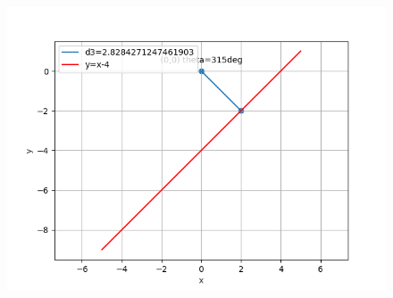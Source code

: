 \documentclass[12pt]{article}
\begin{document}
\begin{enumerate}
\begin{figure}[!h]
	\begin{center} 
	    \includegraphics[width=\columnwidth]{./figs/line3.png}
	\end{center}
\caption{}
\label{fig:Fig}
\end{figure}
\end{enumerate}
\end{document}
